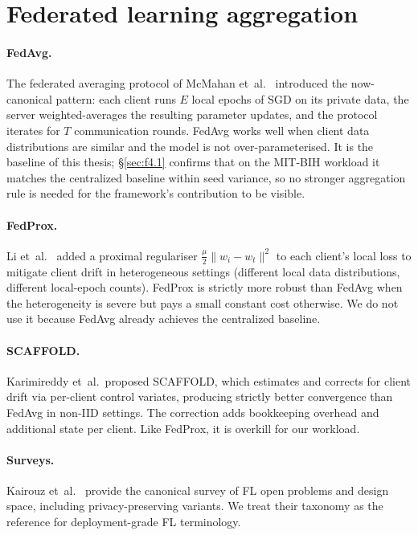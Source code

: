 \documentclass[11pt,a4paper]{report}
\begin{document}
\section{Federated learning aggregation}\label{sec:rw-fl}

\paragraph{FedAvg.} The federated averaging protocol of McMahan
et~al.~\cite{mcmahan2017fedavg} introduced the now-canonical pattern: each
client runs $E$ local epochs of SGD on its private data, the server
weighted-averages the resulting parameter updates, and the protocol
iterates for $T$ communication rounds. FedAvg works well when client data
distributions are similar and the model is not over-parameterised. It is
the baseline of this thesis; \S\ref{sec:f4.1} confirms that on the MIT-BIH
workload it matches the centralized baseline within seed variance, so no
stronger aggregation rule is needed for the framework's contribution to be
visible.

\paragraph{FedProx.} Li et~al.~\cite{li2020fedprox} added a proximal
regulariser $\tfrac{\mu}{2}\|w_i - w_t\|^2$ to each client's local loss to
mitigate client drift in heterogeneous settings (different local data
distributions, different local-epoch counts). FedProx is strictly more
robust than FedAvg when the heterogeneity is severe but pays a small
constant cost otherwise. We do not use it because FedAvg already achieves
the centralized baseline.

\paragraph{SCAFFOLD.} Karimireddy et~al.\ proposed SCAFFOLD, which
estimates and corrects for client drift via per-client control variates,
producing strictly better convergence than FedAvg in non-IID settings. The
correction adds bookkeeping overhead and additional state per client.
Like FedProx, it is overkill for our workload.

\paragraph{Surveys.} Kairouz et~al.~\cite{kairouz2021advances} provide the
canonical survey of FL open problems and design space, including
privacy-preserving variants. We treat their taxonomy as the reference for
deployment-grade FL terminology.
\end{document}
